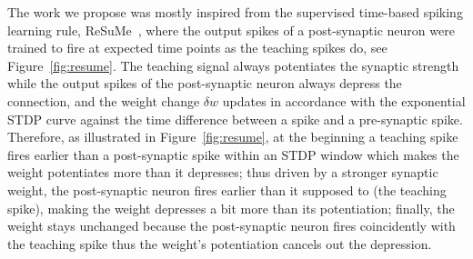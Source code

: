 The work we propose was mostly inspired from the supervised time-based spiking learning rule, ReSuMe~\cite{ponulak2010supervised}, where the output spikes of a post-synaptic neuron were trained to fire at expected time points as the teaching spikes do, see Figure~\ref{fig:resume}.
The teaching signal always potentiates the synaptic strength while the output spikes of the post-synaptic neuron always depress the connection, and the weight change $\delta w$ updates in accordance with the exponential STDP curve against the time difference between a spike and a pre-synaptic spike.
Therefore, as illustrated in Figure~\ref{fig:resume}, at the beginning a teaching spike fires earlier than a post-synaptic spike within an STDP window which makes the weight potentiates more than it depresses;
thus driven by a stronger synaptic weight, the post-synaptic neuron fires earlier than it supposed to (the teaching spike), making the weight depresses a bit more than its potentiation;
finally, the weight stays unchanged because the post-synaptic neuron fires coincidently with the teaching spike thus the weight's potentiation cancels out the depression.
